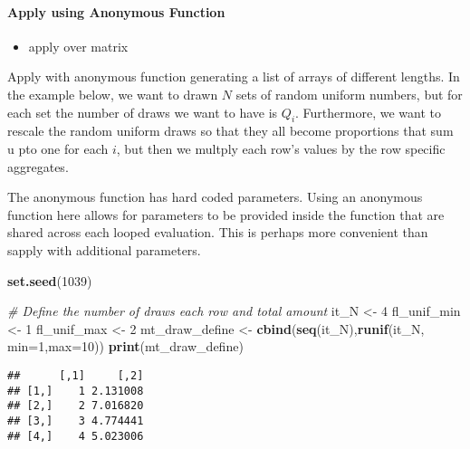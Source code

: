 \documentclass[
]{book}
\newenvironment{Shaded}{\begin{snugshade}}{\end{snugshade}}
\newcommand{\CommentTok}[1]{\textcolor[rgb]{0.56,0.35,0.01}{\textit{#1}}}
\newcommand{\DataTypeTok}[1]{\textcolor[rgb]{0.13,0.29,0.53}{#1}}
\newcommand{\DecValTok}[1]{\textcolor[rgb]{0.00,0.00,0.81}{#1}}
\newcommand{\KeywordTok}[1]{\textcolor[rgb]{0.13,0.29,0.53}{\textbf{#1}}}
\newcommand{\NormalTok}[1]{#1}
\newcommand{\StringTok}[1]{\textcolor[rgb]{0.31,0.60,0.02}{#1}}
\providecommand{\tightlist}{%
  \setlength{\itemsep}{0pt}\setlength{\parskip}{0pt}}
\begin{document}
\hypertarget{apply-using-anonymous-function}{%
\paragraph{Apply using Anonymous Function}\label{apply-using-anonymous-function}}

\begin{itemize}
\tightlist
\item
  apply over matrix
\end{itemize}

Apply with anonymous function generating a list of arrays of different lengths. In the example below, we want to drawn \(N\) sets of random uniform numbers, but for each set the number of draws we want to have is \(Q_i\). Furthermore, we want to rescale the random uniform draws so that they all become proportions that sum u pto one for each \(i\), but then we multply each row's values by the row specific aggregates.

The anonymous function has hard coded parameters. Using an anonymous function here allows for parameters to be provided inside the function that are shared across each looped evaluation. This is perhaps more convenient than sapply with additional parameters.

\begin{Shaded}
\begin{Highlighting}[]
\KeywordTok{set.seed}\NormalTok{(}\DecValTok{1039}\NormalTok{)}

\CommentTok{# Define the number of draws each row and total amount}
\NormalTok{it_N <-}\StringTok{ }\DecValTok{4}
\NormalTok{fl_unif_min <-}\StringTok{ }\DecValTok{1}
\NormalTok{fl_unif_max <-}\StringTok{ }\DecValTok{2}
\NormalTok{mt_draw_define <-}\StringTok{ }\KeywordTok{cbind}\NormalTok{(}\KeywordTok{seq}\NormalTok{(it_N),}\KeywordTok{runif}\NormalTok{(it_N, }\DataTypeTok{min=}\DecValTok{1}\NormalTok{,}\DataTypeTok{max=}\DecValTok{10}\NormalTok{))}
\KeywordTok{print}\NormalTok{(mt_draw_define)}
\end{Highlighting}
\end{Shaded}

\begin{verbatim}
##      [,1]     [,2]
## [1,]    1 2.131008
## [2,]    2 7.016820
## [3,]    3 4.774441
## [4,]    4 5.023006
\end{verbatim}
\end{document}
